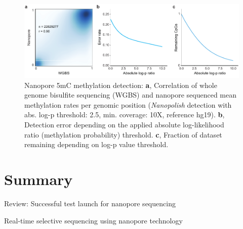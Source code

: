 \begin{figure}[h]
    \centering
    \includegraphics[width=1.0\textwidth]{figures/state_of_art/methylation.pdf}
    \captionsetup{format=plain}
    \caption[Nanopore methylation detection]{Nanopore 5mC methylation detection: \textbf{a}, Correlation of whole genome bisulfite sequencing (WGBS) and nanopore sequenced mean methylation rates per genomic position (\textit{Nanopolish} detection with abs. log-p threshold: 2.5, min. coverage: 10X, reference hg19). \textbf{b}, Detection error depending on the applied absolute log-likelihood ratio (methylation probability) threshold. \textbf{c}, Fraction of dataset remaining depending on log-p value threshold.}
    \label{fig:state_of_art:methylation}
\end{figure}




\section{Summary}
\label{sec:stat_of_art:summary}


Review: Successful test launch for nanopore sequencing \cite{Loman2015a}

Real-time selective sequencing using nanopore technology \cite{Loose2016}







